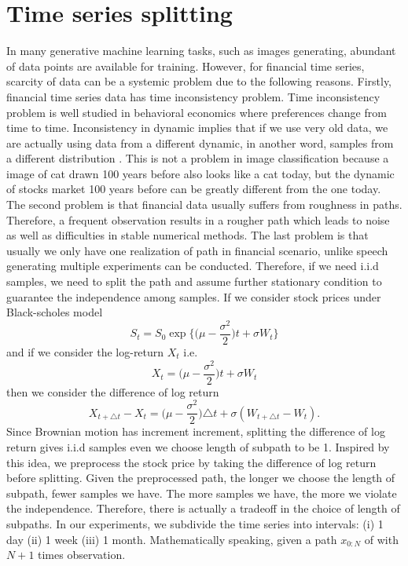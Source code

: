 \documentclass[12pt]{report}
\theoremstyle{definition}
\theoremstyle{remark}
\begin{document}
\section{Time series splitting}
In many generative machine learning tasks, such as images generating, abundant of data points are available for training. However, for financial time series, scarcity of data can be a systemic problem due to the following reasons. Firstly, financial time series data has time inconsistency problem. Time inconsistency problem is well studied in behavioral economics where preferences change from time to time. Inconsistency in dynamic implies that if we use very old data, we are actually using data from a different dynamic, in another word, samples from a different distribution \cite{cont2001empirical}. This is not a problem in image classification because a image of cat drawn 100 years before also looks like a cat today, but the dynamic of stocks market 100 years before can be greatly different from the one today. The second problem is that financial data usually suffers from roughness in paths. Therefore, a frequent observation results in a rougher path which leads to noise as well as difficulties in stable numerical methods. The last problem is that usually we only have one realization of path in financial scenario, unlike speech generating multiple experiments can be conducted. Therefore, if we need i.i.d samples, we need to split the path and assume further stationary condition to guarantee the independence among samples. If we consider stock prices under Black-scholes model
\begin{equation*}
  S_{t} = S_{0}\exp\bigg\{ \big(\mu - \frac{\sigma^2}{2})t + \sigma W_{t}\bigg\}
\end{equation*}
and if we consider the log-return $X_{t}$ i.e. 
\begin{equation*}
  X_{t} = \big(\mu - \frac{\sigma^2}{2})t + \sigma W_{t}
\end{equation*}
then we consider the difference of log return 
\begin{equation*}
  X_{t+\triangle t} - X_{t} =   \big(\mu - \frac{\sigma^2}{2})\triangle t + \sigma (W_{t+\triangle t} - W_{t}).
\end{equation*}
Since Brownian motion has increment increment, splitting the difference of log return gives i.i.d samples even we choose length of subpath to be 1. Inspired by this idea, we preprocess the stock price by taking the difference of log return before splitting. Given the preprocessed path, the longer we choose the length of subpath, fewer samples we have. The more samples we have, the more we violate the independence. Therefore, there is actually a tradeoff in the choice of length of subpaths. In our experiments, we subdivide the time series into intervals: (i) 1 day (ii) 1 week (iii) 1 month. Mathematically speaking, given a path $x_{0:N}$ of with $N+1$ times observation. 
\end{document}
